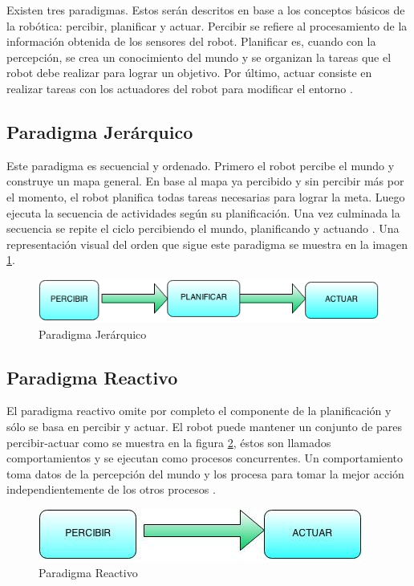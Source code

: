 Existen tres paradigmas. Estos serán descritos en base a los conceptos básicos de la robótica: percibir, planificar y actuar. Percibir se refiere al procesamiento de la información obtenida de los sensores del robot. Planificar es, cuando con la percepción, se crea un conocimiento del mundo y se organizan la tareas que el robot debe realizar para lograr un objetivo. Por último, actuar consiste en realizar tareas con los actuadores del robot para modificar el entorno \cite{AiRobotics}. 

\subsection{Paradigma Jerárquico}

Este paradigma es secuencial y ordenado. Primero el robot percibe el mundo y construye un mapa general. En base al mapa ya percibido y sin percibir m\'as por el momento, el robot planifica todas tareas necesarias para lograr la meta. Luego ejecuta la secuencia de actividades según su planificaci\'on. Una vez culminada la secuencia se repite el ciclo percibiendo el mundo, planificando y actuando \cite{AiRobotics}. Una representación visual del orden que sigue este paradigma se muestra en la imagen \ref{fig:jerarquico}.

\begin{figure}[hbtp]
\centering
\includegraphics[scale=0.7]{imagenes/jerarquico.png} 
\caption{Paradigma Jer\'arquico}
\label{fig:jerarquico}
\end{figure}


\subsection{Paradigma Reactivo}
El paradigma reactivo omite por completo el componente de la planificación y s\'olo se basa en percibir y actuar. El robot puede mantener un conjunto de pares percibir-actuar como se muestra en la figura \ref{fig:reactivo}, \'estos son llamados comportamientos y se ejecutan como procesos concurrentes. Un comportamiento toma datos de la percepción del mundo y los procesa para tomar la mejor acción independientemente de los otros procesos \cite{AiRobotics}.

\begin{figure}[hbtp]

\centering
\includegraphics[scale=0.7]{imagenes/reactivo.jpg} 
\caption{Paradigma Reactivo}
\label{fig:reactivo}
\end{figure}



